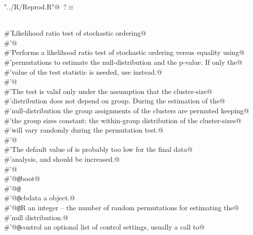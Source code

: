 \documentclass[reqno]{amsart}
\renewcommand{\NWtarget}[2]{\hypertarget{#1}{#2}}
\begin{document}
\begin{flushleft} \small\label{scrap38}\raggedright\small
\NWtarget{nuweb?}{} \verb@"../R/Reprod.R"@\nobreak\ {\footnotesize {?}}$\equiv$
\vspace{-1ex}
\begin{list}{}{} \item
\mbox{}\verb@@\\
\mbox{}\verb@#'Likelihood ratio test of stochastic ordering@\\
\mbox{}\verb@#'@\\
\mbox{}\verb@#'Performs a likelihood ratio test of stochastic ordering versus equality using@\\
\mbox{}\verb@#'permutations to estimate the null-distribution and the p-value.  If only the@\\
\mbox{}\verb@#'value of the test statistic is needed, use  instead.@\\
\mbox{}\verb@#'@\\
\mbox{}\verb@#'The test is valid only under the assumption that the cluster-size@\\
\mbox{}\verb@#'distribution does not depend on group. During the estimation of the@\\
\mbox{}\verb@#'null-distribution the group assignments of the clusters are permuted keeping@\\
\mbox{}\verb@#'the group sizes constant; the within-group distribution of the cluster-sizes@\\
\mbox{}\verb@#'will vary randomly during the permutation test.@\\
\mbox{}\verb@#'@\\
\mbox{}\verb@#'The default value of  is probably too low for the final data@\\
\mbox{}\verb@#'analysis, and should be increased.@\\
\mbox{}\verb@#'@\\
\mbox{}\verb@#'@{\tt @}\verb@import boot@\\
\mbox{}\verb@#'@{\tt @}\verb@export@\\
\mbox{}\verb@#'@{\tt @}\verb@param cbdata a  object.@\\
\mbox{}\verb@#'@{\tt @}\verb@param R an integer -- the number of random permutations for estimating the@\\
\mbox{}\verb@#'null distribution.@\\
\mbox{}\verb@#'@{\tt @}\verb@param control an optional list of control settings, usually a call to@\\

\end{list}
\end{flushleft}
\end{document}
